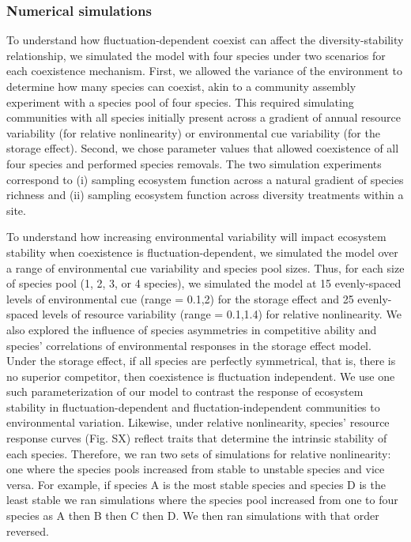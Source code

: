 \documentclass[12pt,]{article}
\begin{document}
\subsubsection{Numerical simulations}\label{numerical-simulations}

To understand how fluctuation-dependent coexist can affect the
diversity-stability relationship, we simulated the model with four
species under two scenarios for each coexistence mechanism. First, we
allowed the variance of the environment to determine how many species
can coexist, akin to a community assembly experiment with a species pool
of four species. This required simulating communities with all species
initially present across a gradient of annual resource variability (for
relative nonlinearity) or environmental cue variability (for the storage
effect). Second, we chose parameter values that allowed coexistence of
all four species and performed species removals. The two simulation
experiments correspond to (i) sampling ecosystem function across a
natural gradient of species richness and (ii) sampling ecosystem
function across diversity treatments within a site.

To understand how increasing environmental variability will impact
ecosystem stability when coexistence is fluctuation-dependent, we
simulated the model over a range of environmental cue variability and
species pool sizes. Thus, for each size of species pool (1, 2, 3, or 4
species), we simulated the model at 15 evenly-spaced levels of
environmental cue (range = 0.1,2) for the storage effect and 25
evenly-spaced levels of resource variability (range = 0.1,1.4) for
relative nonlinearity. We also explored the influence of species
asymmetries in competitive ability and species' correlations of
environmental responses in the storage effect model. Under the storage
effect, if all species are perfectly symmetrical, that is, there is no
superior competitor, then coexistence is fluctuation independent. We use
one such parameterization of our model to contrast the response of
ecosystem stability in fluctuation-dependent and fluctation-independent
communities to environmental variation. Likewise, under relative
nonlinearity, species' resource response curves (Fig. SX) reflect traits
that determine the intrinsic stability of each species. Therefore, we
ran two sets of simulations for relative nonlinearity: one where the
species pools increased from stable to unstable species and vice versa.
For example, if species A is the most stable species and species D is
the least stable we ran simulations where the species pool increased
from one to four species as A then B then C then D. We then ran
simulations with that order reversed.
\end{document}
